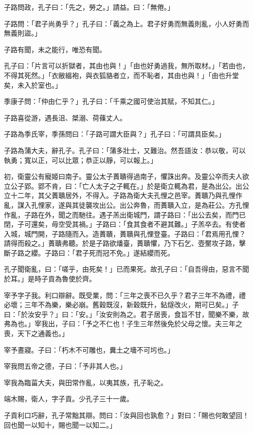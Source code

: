 \begin{pinyinscope}
子路問政，孔子曰：「先之，勞之。」請益。曰：「無倦。」

子路問：「君子尚勇乎？」孔子曰：「義之為上。君子好勇而無義則亂，小人好勇而無義則盜。」

子路有聞，未之能行，唯恐有聞。

孔子曰：「片言可以折獄者，其由也與！」「由也好勇過我，無所取材。」「若由也，不得其死然。」「衣敝縕袍，與衣狐貉者立，而不恥者，其由也與！」「由也升堂矣，未入於室也。」

季康子問：「仲由仁乎？」孔子曰：「千乘之國可使治其賦，不知其仁。」

子路喜從游，遇長沮、桀溺、荷蓧丈人。

子路為季氏宰，季孫問曰：「子路可謂大臣與？」孔子曰：「可謂具臣矣。」

子路為蒲大夫，辭孔子。孔子曰：「蒲多壯士，又難治。然吾語汝：恭以敬，可以執勇；寬以正，可以比眾；恭正以靜，可以報上。」

初，衛靈公有寵姬曰南子。靈公太子蕢聵得過南子，懼誅出奔。及靈公卒而夫人欲立公子郢。郢不肯，曰：「亡人太子之子輒在。」於是衛立輒為君，是為出公。出公立十二年，其父蕢聵居外，不得入。子路為衛大夫孔悝之邑宰。蕢聵乃與孔悝作亂，謀入孔悝家，遂與其徒襲攻出公。出公奔魯，而蕢聵入立，是為莊公。方孔悝作亂，子路在外，聞之而馳往。遇子羔出衛城門，謂子路曰：「出公去矣，而門已閉，子可還矣，毋空受其禍。」子路曰：「食其食者不避其難。」子羔卒去。有使者入城，城門開，子路隨而入。造蕢聵，蕢聵與孔悝登臺。子路曰：「君焉用孔悝？請得而殺之。」蕢聵弗聽。於是子路欲燔臺，蕢聵懼，乃下石乞、壺黶攻子路，擊斷子路之纓。子路曰：「君子死而冠不免。」遂結纓而死。

孔子聞衛亂，曰：「嗟乎，由死矣！」已而果死。故孔子曰：「自吾得由，惡言不聞於耳。」是時子貢為魯使於齊。

宰予字子我。利口辯辭。既受業，問：「三年之喪不已久乎？君子三年不為禮，禮必壞；三年不為樂，樂必崩。舊穀既沒，新穀既升，鉆燧改火，期可已矣。」子曰：「於汝安乎？」曰：「安。」「汝安則為之。君子居喪，食旨不甘，聞樂不樂，故弗為也。」宰我出，子曰：「予之不仁也！子生三年然後免於父母之懷。夫三年之喪，天下之通義也。」

宰予晝寢。子曰：「朽木不可雕也，糞土之墻不可圬也。」

宰我問五帝之德，子曰：「予非其人也。」

宰我為臨菑大夫，與田常作亂，以夷其族，孔子恥之。

端木賜，衛人，字子貢。少孔子三十一歲。

子貢利口巧辭，孔子常黜其辯。問曰：「汝與回也孰愈？」對曰：「賜也何敢望回！回也聞一以知十，賜也聞一以知二。」


\end{pinyinscope}
